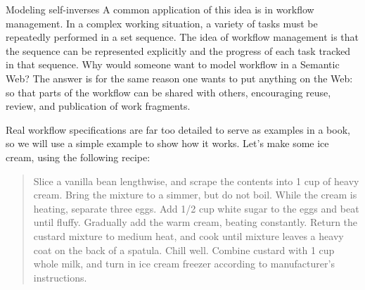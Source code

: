 \begin{challenge}{Modeling self-inverses}
A common application of this idea is in workflow management. In a
complex working situation, a variety of tasks must be repeatedly
performed in a set sequence. The idea of workflow management is that the
sequence can be represented explicitly and the progress of each task
tracked in that sequence. Why would someone want to model workflow in a
Semantic Web? The answer is for the same reason one wants to put
anything on the Web: so that parts of the workflow can be shared with
others, encouraging reuse, review, and publication of work fragments.

Real workflow specifications are far too detailed to serve as examples
in a book, so we will use a simple example to show how it works. Let's
make some ice cream, using the following recipe:


\begin{quote}
Slice a vanilla bean lengthwise, and scrape the contents into 1 cup of
heavy cream. Bring the mixture to a simmer, but do not boil. While the
cream is heating, separate three eggs. Add 1/2 cup white sugar to the
eggs and beat until fluffy. Gradually add the warm cream, beating
constantly. Return the custard mixture to medium heat, and cook until
mixture leaves a heavy coat on the back of a spatula. Chill well. Combine custard with 1 cup whole milk, and turn in ice cream freezer according to manufacturer's instructions.
\end{quote}




\end{challenge}

